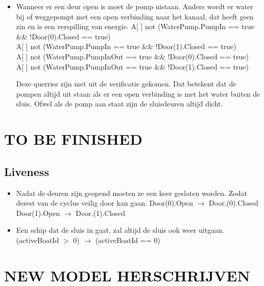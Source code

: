 \documentclass{article}
\begin{document}
\begin{itemize}
\item Wanneer er een deur open is moet de pomp uistaan. Anders wordt er water bij of weggepompt met een open verbinding naar het kanaal, dat heeft geen zin en is een verspilling van energie.
{\center
A[ ] not (WaterPump.PumpIn == true \&\& !Door(0).Closed == true)\\
A[ ] not (WaterPump.PumpIn == true \&\& !Door(1).Closed == true)\\
\vskip0.2cm
A[ ] not (WaterPump.PumpInOut == true \&\& !Door(0).Closed == true)\\
A[ ] not (WaterPump.PumpInOut == true \&\& !Door(1).Closed == true)\\
}
\vskip0.3cm

Deze querries zijn met {\color{green}{groen}} uit de verificatie gekomen. Dat betekent dat de pompen altijd uit staan als er een open verbinding is met het water buiten de sluis. Ofwel als de pomp aan staat zijn de sluisdeuren altijd dicht.
\end{itemize}


\clearpage %
\section{\Large\color{red} \textbf{TO BE FINISHED}}
\subsection{Liveness}
\begin{itemize}

\item Nadat de deuren zijn geopend moeten ze een keer gesloten worden. Zodat derest van de cyclus veilig door kan gaan.
{\center
Door(0).Open $\rightarrow$ Door.(0).Closed\\
Door(1).Open $\rightarrow$ Door.(1).Closed\\
}
\vskip0.5cm
\item Een schip dat de sluis in gaat, zal altijd de sluis ook weer uitgaan.
{\center
(activeBoatId $>$ 0) $\rightarrow$ (activeBoatId == 0)\\
}
\end{itemize}

\vskip2cm


\clearpage %
\section{\Large\color{red} \textbf{NEW MODEL HERSCHRIJVEN}}
\end{document}
